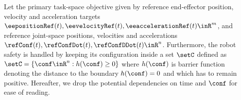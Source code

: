 Let the primary task-space objective given by reference end-effector position, velocity and acceleration targets $\eepositionRef(t),\eevelocityRef(t),\eeaccelerationRef(t)\inR^m$,
and reference joint-space positions, velocities and accelerations $\refConf(t),\refConfDot(t),\refConfDDot(t)\inR^n$. 
 Furthermore, the robot safety is handled by keeping its configuration inside a set $\setC$ defined as $\setC=\left\{\conf\inR^n:h(\conf)\geq0\right\}$ where $h(\conf)$ is barrier function denoting the distance to the boundary $h(\conf)=0$ and which has to remain positive. 
Hereafter, we drop the potential dependencies on time and $\conf$ for ease of reading.



